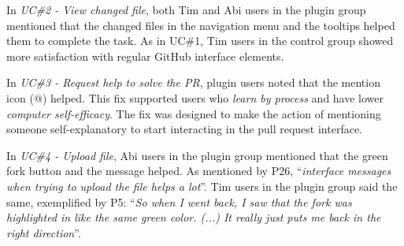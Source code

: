{%

In \textit{UC\#2 - View changed file}, both Tim and Abi users in the plugin group mentioned that the changed files in the navigation menu and the tooltips helped them to complete the task. %
As in UC\#1, Tim users in the control group showed more satisfaction with regular GitHub interface elements.




In \textit{UC\#3 - Request help to solve the PR}, plugin users noted that the mention icon (@) helped. This fix supported users who \textit{learn by process} and have lower \textit{computer self-efficacy}. The fix was designed to make the action of mentioning someone self-explanatory to start interacting in the pull request interface. 


In \textit{UC\#4 - Upload file}, Abi users in the plugin group mentioned that the green fork button and the message helped. As mentioned by P26, ``\textit{interface messages when trying to upload the file helps a lot}''. Tim users in the plugin group said the same, exemplified by P5: ``\textit{So when I went back, I saw that the fork was highlighted in like the same green color. (...) It really just puts me back in the right direction}''.

} 